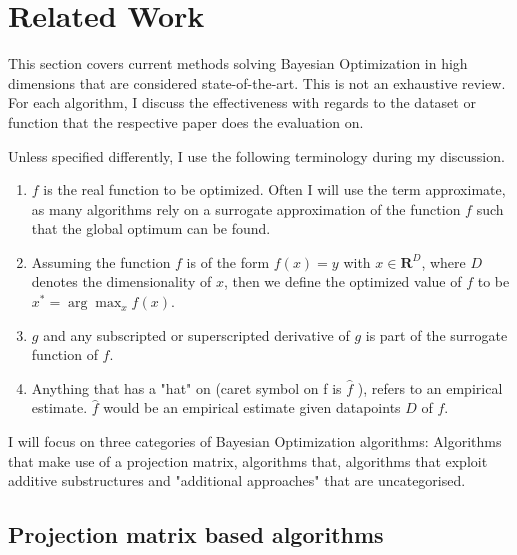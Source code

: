 
\chapter{Related Work}

\ifpdf
    \graphicspath{{04_Chapter2/Figs/Raster/}{04_Chapter2/Figs/PDF/}{04_Chapter2/Figs/}}
\else
    \graphicspath{{04_Chapter2/Figs/Vector/}{04_Chapter2/Figs/}}
\fi

This section covers current methods solving Bayesian Optimization in high dimensions that are considered state-of-the-art.
This is not an exhaustive review. 
For each algorithm, I discuss the effectiveness with regards to the dataset or function that the respective paper does the evaluation on.

Unless specified differently, I use the following terminology during my discussion.

\begin{enumerate}
\item $f$ is the real function to be optimized. Often I will use the term approximate, as many algorithms rely on a surrogate approximation of the function $f$ such that the global optimum can be found.
\item Assuming the function $f$ is of the form $f(x) = y$ with $x \in \mathbf{R}^D$, where $D$ denotes the dimensionality of $x$, then we define the optimized value of $f$ to be $x^* = \arg \max_{x} f(x)$.
\item $g$ and any subscripted or superscripted derivative of $g$ is part of the surrogate function of $f$.
\item Anything that has a "hat" on (caret symbol on f is $\hat{f}$ ), refers to an empirical estimate. 
$\hat{f}$ would be an empirical estimate given datapoints $\mathit{D}$ of $f$.
\end{enumerate}

I will focus on three categories of Bayesian Optimization algorithms: Algorithms that make use of a projection matrix, algorithms that, algorithms that exploit additive substructures and "additional approaches" that are uncategorised.

\section{Projection matrix based algorithms}

